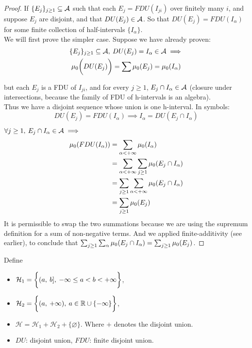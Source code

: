 \documentclass[../../main.tex]{subfiles}
\begin{document}
\begin{wts}

\end{wts}
\begin{proof}

If $\{E_j\}_{j\geq 1}\subseteq \mathcal{A}$ such that each $E_j = FDU(I_{ji})$ over finitely many $i$, and suppose $E_j$ are disjoint, and that $DU(E_j)\in\mathcal{A}$. So that $DU(E_j) = FDU(I_{\alpha})$ for some finite collection of half-intervals $\{I_\alpha\}$. \\

We will first prove the simpler case. Suppose we have already proven:
\begin{multline}
\{E_j\}_{j\geq 1}\subseteq\mathcal{A},\: DU(E_j) = I_\alpha \in \mathcal{A}\implies \\
\mu_0\biggl(DU(E_j)\biggr) = \sum \mu_0(E_j) = \mu_0(I_\alpha)
\end{multline}

but each $E_j$ is a FDU of $I_{ji}$, and for every $j\geq 1$, $E_j\cap I_\alpha\in\mathcal{A}$ (closure under intersections, because the family of FDU of h-intervals is an algebra).\\

Thus we have a disjoint sequence whose union is one h-interval. In symbols:
\[
DU(E_j) = FDU(I_{\alpha}) \implies I_{\alpha} = DU( E_j \cap I_{\alpha})
\]

$\forall j\geq 1,\: E_j\cap I_\alpha\in\mathcal{A}\implies$
\begin{align*}
\mu_0 (FDU(I_{\alpha})) &= \sum_{\alpha<+\infty}\mu_0(I_\alpha)\\
&= \sum_{\alpha<+\infty} \sum_{j\geq 1} \mu_0(E_j\cap I_{\alpha})\\
&= \sum_{j\geq 1} \sum_{\alpha<+\infty}  \mu_0(E_j\cap I_{\alpha})\\
&= \sum_{j\geq 1}\mu_0(E_j)
\end{align*}
It is permissible to swap the two summations because we are using the supremum definition for a sum of non-negative terms. And we applied finite-additivity (see earlier), to conclude that $\sum_{j\geq 1}\sum_{\alpha}\mu_0(E_j\cap I_{\alpha}) = \sum_{j\geq 1}\mu_0(E_j)$.



\end{proof}
\newpage

\providecommand{\hil}{\mathcal{H}}

Define
\begin{itemize}
\item $\hil_1 = \bigset{(a,\: b],\: -\infty\leq a<b<+\infty}$,
\item $\hil_2 = \bigset{(a,\: +\infty),\: a\in\real\cup\{-\infty\}}$,
\item $\hil = \hil_1 + \hil_2 + \{\varnothing\}$. Where $+$ denotes the disjoint union.
\item $DU$: disjoint union, $FDU$: finite disjoint union.
\end{itemize}
\end{document}
